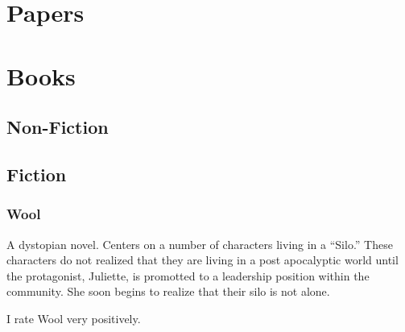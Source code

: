\documentclass[12pt]{article}
\newenvironment{annotatedcitation}[2]%
{\bigskip \subsubsection*{#1} \noindent \fullcite{#2} \bigskip}%
{\bigskip}
\begin{document}
\section{Papers}

\section{Books}

\subsection{Non-Fiction}

\subsection{Fiction}

\begin{annotatedcitation}{Wool}{howey12}


A dystopian novel. Centers on a number of characters living in a
``Silo.'' These characters do not realized that they are living in a
post apocalyptic world until the protagonist, Juliette, is promotted
to a leadership position within the community. She soon begins to
realize that their silo is not alone.

I rate Wool very positively.

\end{annotatedcitation}
\end{document}
